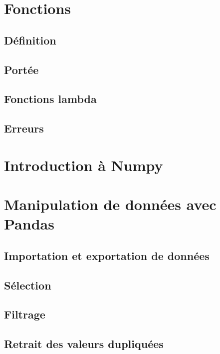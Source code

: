 \documentclass[12pt,]{book}
\numberwithin{equation}{section}
\numberwithin{countremarque}{section}
\begin{document}
\chapter{Fonctions}\label{fonctions}

\section{Définition}\label{definition}

\section{Portée}\label{portee}

\section{Fonctions lambda}\label{fonctions-lambda}

\section{Erreurs}\label{erreurs}

\chapter{Introduction à Numpy}\label{introduction-a-numpy}

\chapter{Manipulation de données avec
Pandas}\label{manipulation-de-donnees-avec-pandas}

\section{Importation et exportation de
données}\label{importation-et-exportation-de-donnees}

\section{Sélection}\label{selection}

\section{Filtrage}\label{filtrage}

\section{Retrait des valeurs
dupliquées}\label{retrait-des-valeurs-dupliquees}
\end{document}

